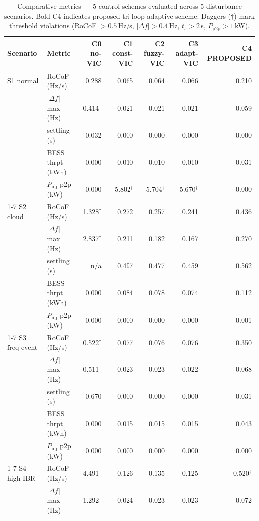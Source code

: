 \begin{table}[t]
\centering
\caption{Comparative metrics — 5 control schemes evaluated across 5 disturbance scenarios. Bold C4 indicates proposed tri-loop adaptive scheme. Daggers ($\dagger$) mark threshold violations (RoCoF $>0.5$\,Hz/s, $|\Delta f| > 0.4$\,Hz, $t_s > 2$\,s, $P_\mathrm{p2p} > 1$\,kW).}
\label{tab:comparative}
\begin{tabular}{llrrrrr}
\toprule
Scenario & Metric & C0 no-VIC & C1 const-VIC & C2 fuzzy-VIC & C3 adapt-VIC & \textbf{C4 PROPOSED} \\
\midrule
  S1 normal & RoCoF (Hz/s) & 0.288 & 0.065 & 0.064 & 0.066 & 0.210 \\
   & $|\Delta f|$ max (Hz) & 0.414$^\dagger$ & 0.021 & 0.021 & 0.021 & 0.059 \\
   & settling (s) & 0.032 & 0.000 & 0.000 & 0.000 & 0.000 \\
   & BESS thrpt (kWh) & 0.000 & 0.010 & 0.010 & 0.010 & 0.031 \\
   & $P_\mathrm{inj}$ p2p (kW) & 0.000 & 5.802$^\dagger$ & 5.704$^\dagger$ & 5.670$^\dagger$ & 0.000 \\
  \cmidrule(lr){1-7}
  S2 cloud & RoCoF (Hz/s) & 1.328$^\dagger$ & 0.272 & 0.257 & 0.241 & 0.436 \\
   & $|\Delta f|$ max (Hz) & 2.837$^\dagger$ & 0.211 & 0.182 & 0.167 & 0.270 \\
   & settling (s) & n/a & 0.497 & 0.477 & 0.459 & 0.562 \\
   & BESS thrpt (kWh) & 0.000 & 0.084 & 0.078 & 0.074 & 0.112 \\
   & $P_\mathrm{inj}$ p2p (kW) & 0.000 & 0.000 & 0.000 & 0.000 & 0.001 \\
  \cmidrule(lr){1-7}
  S3 freq-event & RoCoF (Hz/s) & 0.522$^\dagger$ & 0.077 & 0.076 & 0.076 & 0.350 \\
   & $|\Delta f|$ max (Hz) & 0.511$^\dagger$ & 0.023 & 0.023 & 0.022 & 0.068 \\
   & settling (s) & 0.670 & 0.000 & 0.000 & 0.000 & 0.031 \\
   & BESS thrpt (kWh) & 0.000 & 0.015 & 0.015 & 0.015 & 0.043 \\
   & $P_\mathrm{inj}$ p2p (kW) & 0.000 & 0.000 & 0.000 & 0.000 & 0.000 \\
  \cmidrule(lr){1-7}
  S4 high-IBR & RoCoF (Hz/s) & 4.491$^\dagger$ & 0.126 & 0.135 & 0.125 & 0.520$^\dagger$ \\
   & $|\Delta f|$ max (Hz) & 1.292$^\dagger$ & 0.024 & 0.023 & 0.023 & 0.072 \\

\end{tabular}
\end{table}
